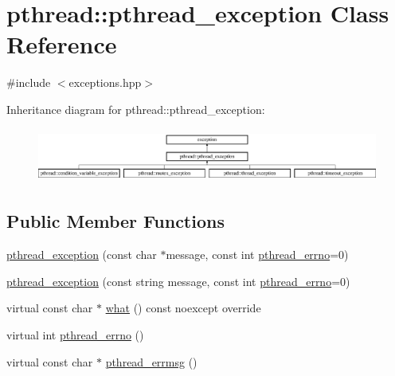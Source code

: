 \hypertarget{classpthread_1_1pthread__exception}{}\section{pthread\+:\+:pthread\+\_\+exception Class Reference}
\label{classpthread_1_1pthread__exception}


{\ttfamily \#include $<$exceptions.\+hpp$>$}

Inheritance diagram for pthread\+:\+:pthread\+\_\+exception\+:\begin{figure}[H]
\begin{center}
\leavevmode
\includegraphics[height=1.794872cm]{classpthread_1_1pthread__exception}
\end{center}
\end{figure}
\subsection*{Public Member Functions}
\begin{DoxyCompactItemize}
\item 
\hyperlink{classpthread_1_1pthread__exception_aa3f5550d956b649cb554092595d7eff0}{pthread\+\_\+exception} (const char $\ast$message, const int \hyperlink{classpthread_1_1pthread__exception_a4a869173054faca1945ac1a7729082d6}{pthread\+\_\+errno}=0)
\item 
\hyperlink{classpthread_1_1pthread__exception_a157d4379b6eddcc82ca504534c51abe6}{pthread\+\_\+exception} (const string message, const int \hyperlink{classpthread_1_1pthread__exception_a4a869173054faca1945ac1a7729082d6}{pthread\+\_\+errno}=0)
\item 
virtual const char $\ast$ \hyperlink{classpthread_1_1pthread__exception_a6389bf5caec2b67fa2c9ece8e72dc162}{what} () const  noexcept override
\item 
virtual int \hyperlink{classpthread_1_1pthread__exception_a4a869173054faca1945ac1a7729082d6}{pthread\+\_\+errno} ()
\item 
virtual const char $\ast$ \hyperlink{classpthread_1_1pthread__exception_afc17488e8f6160865f1beb4d6fc20d2a}{pthread\+\_\+errmsg} ()
\end{DoxyCompactItemize}


